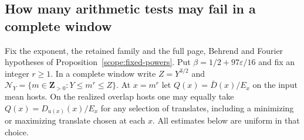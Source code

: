 \subsection{How many arithmetic tests may fail in a complete window}
\label{scope:sparse-window}

Fix the exponent, the retained family and the full page, Behrend
and Fourier hypotheses of Proposition~\ref{scope:fixed-powers}.
Put \(\beta=1/2+97\varepsilon/16\) and fix an integer \(r\ge1\).
In a complete window write \(Z=Y^{3/2}\) and
\(\mathcal N_Y=\{m\in\mathbf Z_{>0}:Y\le m^r\le Z\}\).
At \(x=m^r\) let \(Q(x)=\bar D(x)/E_x\) on the input mean hosts.
On the realized overlap hosts one may equally take
\(Q(x)=D_{u(x)}(x)/E_x\) for any selection of translates, including
a minimizing or maximizing translate chosen at each \(x\).
All estimates below are uniform in that choice.

